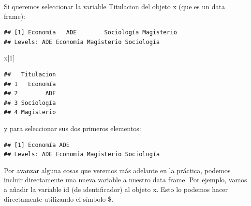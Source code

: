 \documentclass[
]{book}
\newenvironment{Shaded}{\begin{snugshade}}{\end{snugshade}}
\newcommand{\DecValTok}[1]{\textcolor[rgb]{0.00,0.00,0.81}{#1}}
\newcommand{\NormalTok}[1]{#1}
\newcommand{\OtherTok}[1]{\textcolor[rgb]{0.56,0.35,0.01}{#1}}
\newcommand{\SpecialCharTok}[1]{\textcolor[rgb]{0.00,0.00,0.00}{#1}}
\begin{document}
Si queremos seleccionar la variable Titulacion del objeto x (que es un data frame):

\begin{Shaded}
\end{Shaded}

\begin{verbatim}
## [1] Economía   ADE        Sociología Magisterio
## Levels: ADE Economía Magisterio Sociología
\end{verbatim}

\begin{Shaded}
\begin{Highlighting}[]
\NormalTok{x[}\DecValTok{1}\NormalTok{]}
\end{Highlighting}
\end{Shaded}

\begin{verbatim}
##   Titulacion
## 1   Economía
## 2        ADE
## 3 Sociología
## 4 Magisterio
\end{verbatim}

y para seleccionar sus dos primeros elementos:

\begin{Shaded}
\end{Shaded}

\begin{verbatim}
## [1] Economía ADE     
## Levels: ADE Economía Magisterio Sociología
\end{verbatim}

Por avanzar alguna cosas que veremos más adelante en la práctica, podemos incluir directamente una nueva variable a nuestro data frame. Por ejemplo, vamos a añadir la variable id (de identificador) al objeto x. Esto lo podemos hacer directamente utilizando el símbolo \$.

\begin{Shaded}
\end{Shaded}
\end{document}

